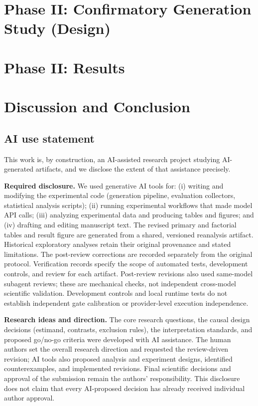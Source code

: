 \documentclass{article}
\begin{document}
\section{Phase II: Confirmatory Generation Study (Design)}\label{sec:phase2}


\section{Phase II: Results}\label{sec:results}


\section{Discussion and Conclusion}\label{sec:discussion}




\label{endofmain}

\subsection*{AI use statement}

This work is, by construction, an AI-assisted research project studying
AI-generated artifacts, and we disclose the extent of that assistance precisely.

\textbf{Required disclosure.} We used generative AI tools for: (i) writing and
modifying the experimental code (generation pipeline, evaluation collectors,
statistical analysis scripts); (ii) running experimental workflows that
made model API calls; (iii) analyzing experimental data and
producing tables and figures; and (iv) drafting and editing manuscript text.
The revised primary and factorial tables and result figure are generated
from a shared, versioned reanalysis artifact. Historical exploratory analyses
retain their original provenance and stated limitations. The post-review
corrections are recorded separately from the original protocol.
Verification records specify the scope of automated tests, development
controls, and review for each artifact. Post-review revisions also used
same-model subagent reviews; these are mechanical checks, not independent
cross-model scientific validation. Development controls and local runtime
tests do not establish independent gate calibration or provider-level
execution independence.

\textbf{Research ideas and direction.} The core research questions, the causal
design decisions (estimand, contrasts, exclusion rules), the interpretation
standards, and proposed go/no-go criteria were developed with AI assistance.
The human authors set the overall research direction and requested the
review-driven revision; AI tools also proposed analysis and experiment
designs, identified counterexamples, and implemented revisions. Final
scientific decisions and approval of the submission remain the authors'
responsibility. This disclosure does not claim that every AI-proposed
decision has already received individual author approval.
\end{document}
